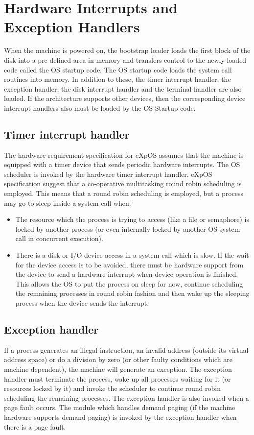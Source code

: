 \chapter{Hardware Interrupts and Exception Handlers}
\label{chap6}

When the machine is powered on, the bootstrap loader loads the first block of the disk into a pre-defined area in memory and transfers control to the newly loaded code called the OS startup code. The OS startup code loads the system call routines into memory. In addition to these, the timer interrupt handler, the exception handler, the disk interrupt handler and the terminal handler are also loaded. If the architecture supports other devices, then the corresponding device interrupt handlers also must be loaded by the OS Startup code. 

\section{Timer interrupt handler}
The hardware requirement specification for eXpOS assumes that the machine is equipped with a timer device that sends periodic hardware interrupts. The OS scheduler is invoked by the hardware timer interrupt handler. eXpOS specification suggest that a co-operative multitasking round robin scheduling is employed. This means that a round robin scheduling is employed, but a process may go to sleep inside a system call when:
\begin{itemize}
\item The resource which the process is trying to access (like a file or semaphore) is locked by another process (or even internally locked by another OS system call in concurrent execution). 
\item There is a disk or I/O device access in a system call which is slow. If the wait for the device access is to be avoided, there must be hardware support from the device to send a hardware interrupt when device operation is finished. This allows the OS to put the process on sleep for now, continue scheduling the remaining processes in round robin fashion and then wake up the sleeping process when the device sends the interrupt. 
\end{itemize}

\section{Exception handler}
If a process generates an illegal instruction, an invalid address (outside its virtual address space) or do a division by zero (or other faulty conditions which are machine dependent), the machine will generate an exception. The exception handler must terminate the process, wake up all processes waiting for it (or resources locked by it) and invoke the scheduler to continue round robin scheduling the remaining processes. The exception handler is also invoked when a page fault occurs. The module which handles demand paging (if the machine hardware supports demand paging) is invoked by the exception handler when there is a page fault. 

